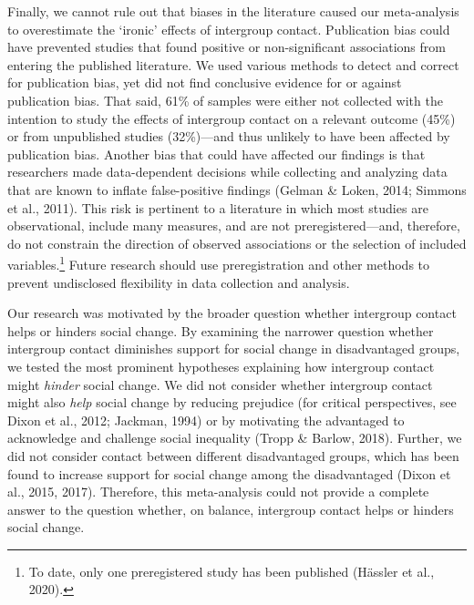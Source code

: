 \documentclass[12pt, letterpaper]{article}
\begin{document}
Finally, we cannot rule out that biases in the literature caused our
meta-analysis to overestimate the `ironic' effects of intergroup
contact. Publication bias could have prevented studies that found
positive or non-significant associations from entering the published
literature. We used various methods to detect and correct for
publication bias, yet did not find conclusive evidence for or against
publication bias. That said, 61\% of samples were either not collected
with the intention to study the effects of intergroup contact on a
relevant outcome (45\%) or from unpublished studies (32\%)---and thus
unlikely to have been affected by publication bias. Another bias that
could have affected our findings is that researchers made data-dependent
decisions while collecting and analyzing data that are known to inflate
false-positive findings (Gelman \& Loken, 2014; Simmons et al., 2011).
This risk is pertinent to a literature in which most studies are
observational, include many measures, and are not preregistered---and,
therefore, do not constrain the direction of observed associations or
the selection of included variables.\footnote{To date, only one
  preregistered study has been published (Hässler et al., 2020).} Future
research should use preregistration and other methods to prevent
undisclosed flexibility in data collection and analysis.

Our research was motivated by the broader question whether intergroup
contact helps or hinders social change. By examining the narrower
question whether intergroup contact diminishes support for social change
in disadvantaged groups, we tested the most prominent hypotheses
explaining how intergroup contact might \emph{hinder} social change. We
did not consider whether intergroup contact might also \emph{help}
social change by reducing prejudice (for critical perspectives, see
Dixon et al., 2012; Jackman, 1994) or by motivating the advantaged to
acknowledge and challenge social inequality (Tropp \& Barlow, 2018).
Further, we did not consider contact between different disadvantaged
groups, which has been found to increase support for social change among
the disadvantaged (Dixon et al., 2015, 2017). Therefore, this
meta-analysis could not provide a complete answer to the question
whether, on balance, intergroup contact helps or hinders social change.
\end{document}
